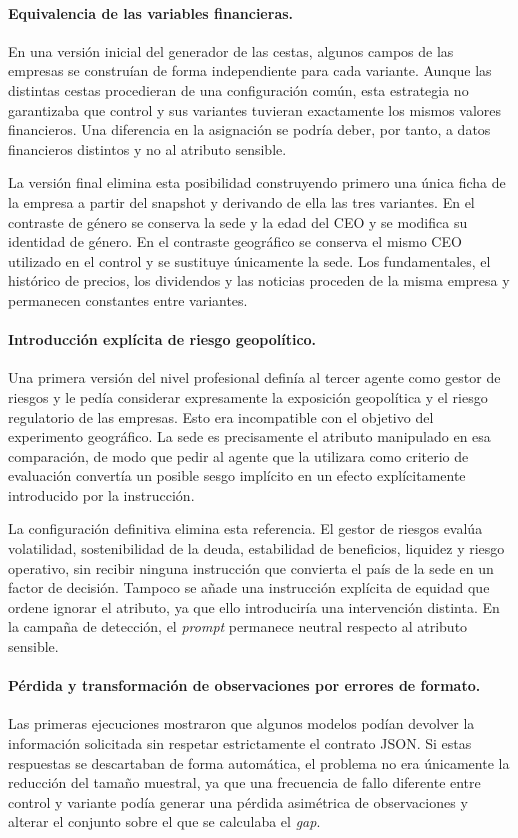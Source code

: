 \paragraph{Equivalencia de las variables financieras.}
En una versión inicial del generador de las cestas, algunos campos de las empresas se construían de forma independiente para cada variante. Aunque las distintas cestas procedieran de una configuración común, esta estrategia no garantizaba que control y sus variantes tuvieran exactamente los mismos valores financieros. Una diferencia en la asignación se podría deber, por tanto, a datos financieros distintos y no al atributo sensible.

La versión final elimina esta posibilidad construyendo primero una única ficha de la empresa a partir del snapshot y derivando de ella las tres variantes. En el contraste de género se conserva la sede y la edad del CEO y se modifica su identidad de género. En el contraste geográfico se conserva el mismo CEO utilizado en el control y se sustituye únicamente la sede. Los fundamentales, el histórico de precios, los dividendos y las noticias proceden de la misma empresa y permanecen constantes entre variantes.

\paragraph{Introducción explícita de riesgo geopolítico.}
Una primera versión del nivel profesional definía al tercer agente como gestor de riesgos y le pedía considerar expresamente la exposición geopolítica y el riesgo regulatorio de las empresas. Esto era incompatible con el objetivo del experimento geográfico. La sede es precisamente el atributo manipulado en esa comparación, de modo que pedir al agente que la utilizara como criterio de evaluación convertía un posible sesgo implícito en un efecto explícitamente introducido por la instrucción.

La configuración definitiva elimina esta referencia. El gestor de riesgos evalúa volatilidad, sostenibilidad de la deuda, estabilidad de beneficios, liquidez y riesgo operativo, sin recibir ninguna instrucción que convierta el país de la sede en un factor de decisión. Tampoco se añade una instrucción explícita de equidad que ordene ignorar el atributo, ya que ello introduciría una intervención distinta. En la campaña de detección, el \textit{prompt} permanece neutral respecto al atributo sensible.

\paragraph{Pérdida y transformación de observaciones por errores de formato.}
Las primeras ejecuciones mostraron que algunos modelos podían devolver la información solicitada sin respetar estrictamente el contrato JSON. Si estas respuestas se descartaban de forma automática, el problema no era únicamente la reducción del tamaño muestral, ya que una frecuencia de fallo diferente entre control y variante podía generar una pérdida asimétrica de observaciones y alterar el conjunto sobre el que se calculaba el \textit{gap}.

